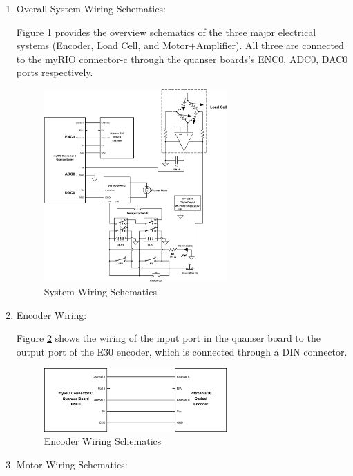 \begin{enumerate}
    \item{Overall System Wiring Schematics:}\par
    Figure \ref{SWS} provides the overview schematics of the three major electrical systems (Encoder, Load Cell, and Motor+Amplifier). All three are connected to the myRIO connector-c through the quanser boards's ENC0, ADC0, DAC0 ports respectively.
    \begin{figure}[H]
    \begin{center}
    \includegraphics[width=2.75in]{Images/system_wiring_schematics.png}
    \caption{System Wiring Schematics}
    \label{SWS}
    \end{center}
    \end{figure}
    \item{Encoder Wiring:}\par
    Figure \ref{EWS} shows the wiring of the input port in the quanser board to the output port of the E30 encoder, which is connected through a DIN connector.
    \begin{figure}[H]
    \begin{center}
    \includegraphics[width=2.75in]{Images/encoder_wiring.png}
    \caption{Encoder Wiring Schematics}
    \label{EWS}
    \end{center}
    \end{figure}
    \item{Motor Wiring Schematics:}\par

\end{enumerate}

